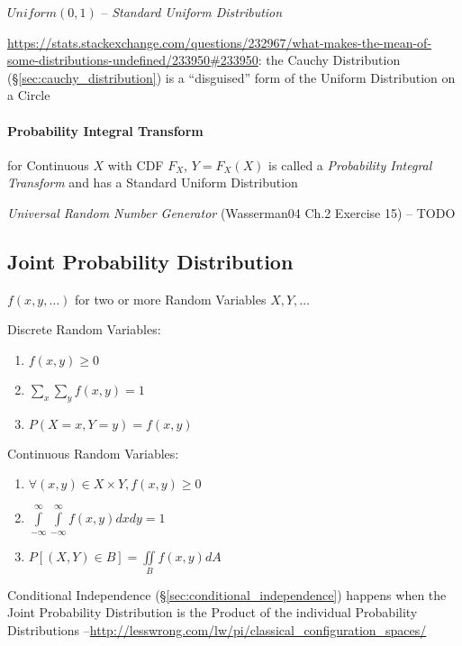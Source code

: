 $Uniform(0,1)$ -- \emph{Standard Uniform Distribution}

\url{https://stats.stackexchange.com/questions/232967/what-makes-the-mean-of-some-distributions-undefined/233950#233950}:
the Cauchy Distribution (\S\ref{sec:cauchy_distribution}) is a ``disguised''
form of the Uniform Distribution on a Circle



\paragraph{Probability Integral Transform}
\label{sec:probability_integral_transform}\hfill

for Continuous $X$ with CDF $F_X$, $Y = F_X(X)$ is called a \emph{Probability
  Integral Transform} and has a Standard Uniform Distribution

\emph{Universal Random Number Generator} (Wasserman04 Ch.2 Exercise 15) -- TODO



\subsection{Joint Probability Distribution}\label{sec:joint_probability}

$f(x,y,\ldots)$ for two or more Random Variables $X,Y,\ldots$

Discrete Random Variables:
\begin{enumerate}
  \item $f(x,y) \geq 0$
  \item $\sum_x \sum_y f(x,y) = 1$
  \item $P(X = x, Y = y) = f(x,y)$
\end{enumerate}

Continuous Random Variables:
\begin{enumerate}
  \item $\forall (x,y) \in X \times Y, f(x,y) \geq 0$
  \item $\int\limits_{-\infty}^{\infty} \int\limits_{-\infty}^{\infty}
    f(x,y) dx dy = 1$
  \item $P[(X,Y) \in B] = \iint\limits_B f(x,y) dA$
\end{enumerate}

Conditional Independence (\S\ref{sec:conditional_independence}) happens when
the Joint Probability Distribution is the Product of the individual Probability
Distributions
--\url{http://lesswrong.com/lw/pi/classical_configuration_spaces/}

